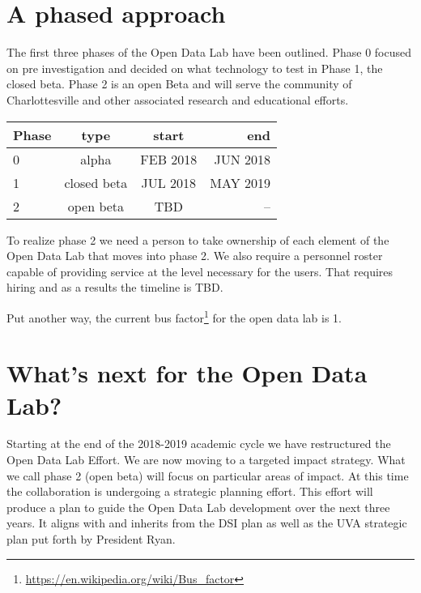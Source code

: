 \section{A phased approach}
\label{phases}
The first three phases of the Open Data Lab have been outlined. Phase 0 focused on pre investigation and decided on what technology to test in Phase 1, the closed beta. Phase 2 is an open Beta and will serve the community of Charlottesville and other associated research and educational efforts.
\begin{center}
\begin{tabular}{lccr}
\hline
\hline
Phase & type & start & end \\
\hline
0 & alpha & FEB 2018 & JUN 2018\\
1 & closed beta & JUL 2018 & MAY 2019 \\
2 & open beta & TBD & -- \\
\hline
\hline
\end{tabular}
\end{center}
To realize phase 2 we need a person to take ownership of each element of the Open Data Lab that moves into phase 2. We also require a personnel roster capable of providing service at the level necessary for the users. That requires hiring and as a results the timeline is TBD.

Put another way, the current bus factor\footnote{\url{https://en.wikipedia.org/wiki/Bus_factor}} for the open data lab is 1.

\section{What's next for the Open Data Lab?}
Starting at the end of the 2018-2019 academic cycle we have restructured the Open Data Lab Effort. We are now moving to a targeted impact strategy. What we call phase 2 (open beta) will focus on particular areas of impact. At this time the collaboration is undergoing a strategic planning effort. This effort will produce a plan to guide the Open Data Lab development over the next three years. It aligns with and inherits from the DSI plan as well as the UVA strategic plan put forth by President Ryan.
